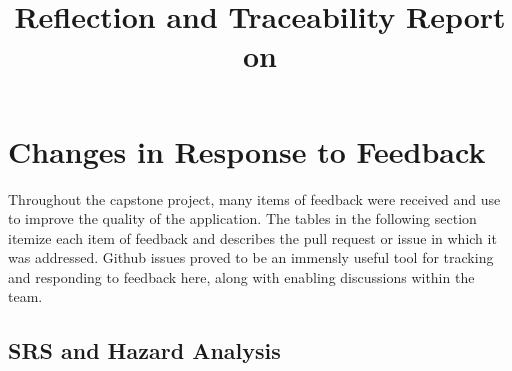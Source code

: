\documentclass{article}
\title{Reflection and Traceability Report on \progname}
\author{\authname}
\date{}
\begin{document}
\maketitle

\section{Changes in Response to Feedback}
Throughout the capstone project, many items of feedback were received and use to improve the quality of the application.
The tables in the following section itemize each item of feedback and describes the pull request or issue in which it was addressed.
Github issues proved to be an immensly useful tool for tracking and responding to feedback here, along with enabling discussions
within the team.

\subsection{SRS and Hazard Analysis}
\end{document}

